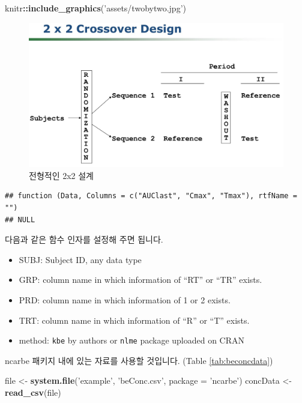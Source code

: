 \documentclass[12pt,]{krantz}
\newenvironment{Shaded}{\begin{snugshade}}{\end{snugshade}}
\newcommand{\DataTypeTok}[1]{\textcolor[rgb]{0.13,0.29,0.53}{#1}}
\newcommand{\KeywordTok}[1]{\textcolor[rgb]{0.13,0.29,0.53}{\textbf{#1}}}
\newcommand{\NormalTok}[1]{#1}
\newcommand{\OperatorTok}[1]{\textcolor[rgb]{0.81,0.36,0.00}{\textbf{#1}}}
\newcommand{\StringTok}[1]{\textcolor[rgb]{0.31,0.60,0.02}{#1}}
\providecommand{\tightlist}{%
  \setlength{\itemsep}{0pt}\setlength{\parskip}{0pt}}
\begin{document}
\begin{Shaded}
\begin{Highlighting}[]
\NormalTok{knitr}\OperatorTok{::}\KeywordTok{include_graphics}\NormalTok{(}\StringTok{'assets/twobytwo.jpg'}\NormalTok{)}
\end{Highlighting}
\end{Shaded}

\begin{figure}
\includegraphics[width=1\linewidth]{assets/twobytwo} \caption{전형적인 2x2 설계}\label{fig:twobytwo}
\end{figure}

\begin{verbatim}
## function (Data, Columns = c("AUClast", "Cmax", "Tmax"), rtfName = "") 
## NULL
\end{verbatim}

다음과 같은 함수 인자를 설정해 주면 됩니다.

\begin{itemize}
\tightlist
\item
  SUBJ: Subject ID, any data type
\item
  GRP: column name in which information of ``RT'' or ``TR'' exists.
\item
  PRD: column name in which information of 1 or 2 exists.
\item
  TRT: column name in which information of ``R'' or ``T'' exists.
\item
  method: \texttt{kbe} by authors or \texttt{nlme} package uploaded on CRAN
\end{itemize}

ncarbe 패키지 내에 있는 자료를 사용할 것입니다. (Table \ref{tab:beconcdata})

\begin{Shaded}
\begin{Highlighting}[]
\NormalTok{file <-}\StringTok{ }\KeywordTok{system.file}\NormalTok{(}\StringTok{'example'}\NormalTok{, }\StringTok{'beConc.csv'}\NormalTok{, }\DataTypeTok{package =} \StringTok{'ncarbe'}\NormalTok{)}
\NormalTok{concData <-}\StringTok{ }\KeywordTok{read_csv}\NormalTok{(file)}
\end{Highlighting}
\end{Shaded}
\end{document}
